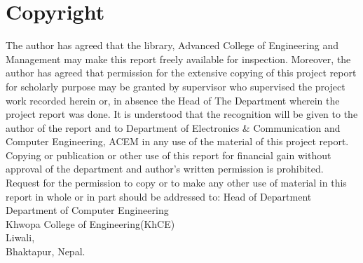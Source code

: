 \large
	\chapter*{Copyright}
\normalsize
\justifying
The author has agreed that the library, Advanced College of Engineering and
Management may make this report freely available for inspection. Moreover, the author
has agreed that permission for the extensive copying of this project report for scholarly
purpose may be granted by supervisor who supervised the project work recorded herein
or, in absence the Head of The Department wherein the project report was done. It is
understood that the recognition will be given to the author of the report and to
Department of Electronics \& Communication and Computer Engineering, ACEM in
any use of the material of this project report. Copying or publication or other use of this
report for financial gain without approval of the department and author’s written
permission is prohibited. Request for the permission to copy or to make any other use
of material in this report in whole or in part should be addressed to:
Head of Department\\
\vspace{1.5cm}
Department of Computer Engineering\\
Khwopa College of Engineering(KhCE)\\
Liwali,\\
Bhaktapur, Nepal.\\
\break